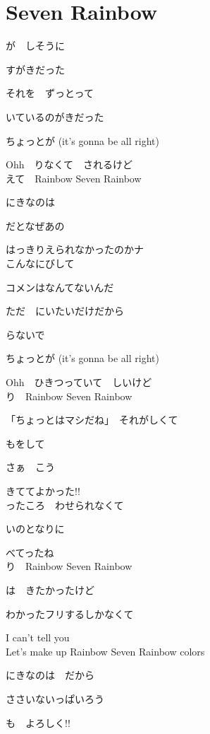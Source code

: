\section{ Seven Rainbow}
\large{

が　しそうに

すがきだった

それを　ずっとって

いているのがきだった

ちょっとが (it's gonna be all right)

Ohh　りなくて　されるけど
\\

えて　Rainbow Seven Rainbow

にきなのは

だとなぜあの

はっきりえられなかったのかナ
\\

こんなにびして

コメンはなんてないんだ

ただ　にいたいだけだから

らないで

ちょっとが (it's gonna be all right)

Ohh　ひきつっていて　しいけど
\\

り　Rainbow Seven Rainbow

「ちょっとはマシだね」　それがしくて

もをして

さぁ　こう

きててよかった!!
\\

ったころ　わせられなくて

いのとなりに

べてったね
\\

り　Rainbow Seven Rainbow

は　きたかったけど

わかったフリするしかなくて

I can't tell you
\\

Let's make up Rainbow Seven Rainbow colors

にきなのは　だから

ささいないっぱいろう

も　よろしく!!

}